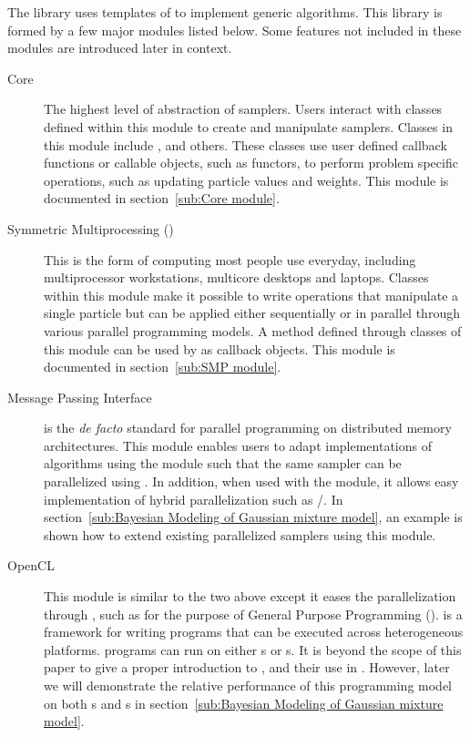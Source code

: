\documentclass[11pt, bib, hyper, mint, minted=cache]{marticle}
\begin{document}
The \vsmc library uses templates of \cpp to implement generic \smc algorithms.
This library is formed by a few major modules listed below. Some features not
included in these modules are introduced later in context.
\begin{description}
  \item[Core] The highest level of abstraction of \smc samplers. Users
    interact with classes defined within this module to create and manipulate
    \smc samplers. Classes in this module include ,
     and others. These classes use user defined callback
    functions or callable objects, such as functors, to perform problem
    specific operations, such as updating particle values and weights. This
    module is documented in section~\ref{sub:Core module}.
  \item[Symmetric Multiprocessing (\smp)] This is the form of computing most
    people use everyday, including multiprocessor workstations, multicore
    desktops and laptops. Classes within this module make it possible to write
    operations that manipulate a single particle but can be applied either
    sequentially or in parallel through various parallel programming models. A
    method defined through classes of this module can be used by
     as callback objects. This module is documented in
    section~\ref{sub:SMP module}.
  \item[Message Passing Interface] \lmpi is the \emph{de facto} standard for
    parallel programming on distributed memory architectures. This module
    enables users to adapt implementations of algorithms using the \smp module
    such that the same sampler can be parallelized using \lmpi. In addition,
    when used with the \smp module, it allows easy implementation of hybrid
    parallelization such as \lmpi/\lopenmp. In section~\ref{sub:Bayesian
      Modeling of Gaussian mixture model}, an example is shown how to extend
    existing \smp parallelized samplers using this module.
  \item[OpenCL] This module is similar to the two above except it eases the
    parallelization through \lopencl, such as for the purpose of General
    Purpose \gpu Programming (\gpgpu). \lopencl is a framework for writing
    programs that can be executed across heterogeneous platforms. \lopencl
    programs can run on either \cpu{}s or \gpu{}s. It is beyond the scope of
    this paper to give a proper introduction to \gpgpu, \lopencl and their use
    in \vsmc. However, later we will demonstrate the relative performance of
    this programming model on both \cpu{}s and \gpu{}s in
    section~\ref{sub:Bayesian Modeling of Gaussian mixture model}.
\end{description}
\end{document}
